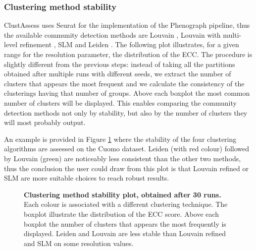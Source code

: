 \subsubsection{Clustering method stability}
ClustAssess uses Seurat for the implementation of the Phenograph pipeline, thus the available community detection methods are Louvain \cite{Blondel2008b}, Louvain with multi-level refinement \cite{Rotta2011}, SLM \cite{Waltman2013} and Leiden \cite{Traag2019a}. The following plot illustrates, for a given range for the resolution parameter, the distribution of the ECC. The procedure is slightly different from the previous steps: instead of taking all the partitions obtained after multiple runs with different seeds, we extract the number of clusters that appears the most frequent and we calculate the consistency of the clusterings having that number of groups. Above each boxplot the most common number of clusters will be displayed. This enables comparing the community detection methods not only by stability, but also by the number of clusters they will most probably output.

An example is provided in Figure \ref{fig:ca-clust-dif-boxplot} where the stability of the four clustering algorithms are assessed on the Cuomo dataset. Leiden (with red colour) followed by Louvain (green) are noticeably less consistent than the other two methods, thus the conclusion the user could draw from this plot is that Louvain refined or SLM are more suitable choices to reach robust results.

\begin{figure}[H]
    \centering
    \caption{\label{fig:ca-clust-dif-boxplot}\textbf{Clustering method stability plot, obtained after 30 runs.} Each colour is associated with a different clustering technique. The boxplot illustrate the distribution of the ECC score. Above each boxplot the number of clusters that appears the most frequently is displayed. Leiden and Louvain are less stable than Louvain refined and SLM on some resolution values.}
\end{figure}

